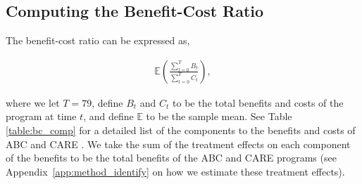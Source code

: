 

\subsection{Computing the Benefit-Cost Ratio}
\label{app:method_cbratio}

\noindent The benefit-cost ratio can be expressed as,

\begin{align}
\mathbb{E} \left( \frac{ \sum_{t=0}^T B_t}{\sum_{t=0}^T C_t} \right),
\end{align}

\noindent where we let $T = 79$, define $B_t$ and $C_t$ to be the total benefits and costs of the
program at time $t$, and define $\mathbb{E}$ to be the sample mean. See Table \ref{table:bc_comp} for a detailed list of the components
to the benefits and costs of ABC and CARE . We take the sum of the treatment effects on each component
of the benefits to be the total benefits of the ABC and CARE programs (see Appendix~\ref{app:method_identify} on how we estimate these treatment effects). \\

